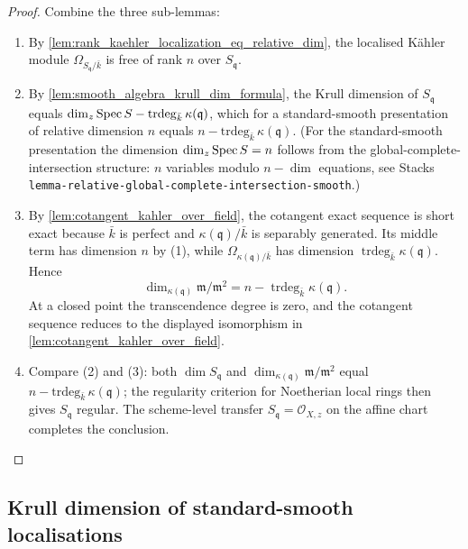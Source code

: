 \begin{proof}
  Combine the three sub-lemmas:
  \begin{enumerate}
    \item By \cref{lem:rank_kaehler_localization_eq_relative_dim},
      the localised K\"ahler module \(\Omega_{S_{\mathfrak q} / \bar k}\)
      is free of rank \(n\) over \(S_{\mathfrak q}\).
    \item By \cref{lem:smooth_algebra_krull_dim_formula}, the Krull dimension of
      \(S_{\mathfrak q}\) equals
      \(\dim_z \operatorname{Spec} S - \mathrm{trdeg}_{\bar k}\,\kappa(\mathfrak q)\),
      which for a standard-smooth presentation of relative dimension
      \(n\) equals \(n - \mathrm{trdeg}_{\bar k}\,\kappa(\mathfrak q)\).
      (For the standard-smooth presentation the dimension
      \(\dim_z \operatorname{Spec} S = n\) follows from the global-complete-intersection
      structure: \(n\) variables modulo \(n - \dim\) equations, see
      Stacks \texttt{lemma-relative-global-complete-intersection-smooth}.)
    \item By \cref{lem:cotangent_kahler_over_field}, the cotangent exact
      sequence is short exact because \(\bar k\) is perfect and
      \(\kappa(\mathfrak q)/\bar k\) is separably generated.  Its middle
      term has dimension \(n\) by (1), while
      \(\Omega_{\kappa(\mathfrak q)/\bar k}\) has dimension
      \(\operatorname{trdeg}_{\bar k}\kappa(\mathfrak q)\).  Hence
      \[
        \dim_{\kappa(\mathfrak q)}\mathfrak m/\mathfrak m^2
        =n-\operatorname{trdeg}_{\bar k}\kappa(\mathfrak q).
      \]
      At a closed point the transcendence degree is zero, and the
      cotangent sequence reduces to the displayed isomorphism in
      \cref{lem:cotangent_kahler_over_field}.
    \item Compare (2) and (3): both \(\dim S_{\mathfrak q}\) and
      \(\dim_{\kappa(\mathfrak q)} \mathfrak m / \mathfrak m^2\) equal
      \(n - \mathrm{trdeg}_{\bar k}\,\kappa(\mathfrak q)\); the
      regularity criterion for Noetherian local rings then gives \(S_{\mathfrak q}\)
      regular. The scheme-level transfer
      \(S_{\mathfrak q} = \mathcal O_{X, z}\) on the affine chart completes
      the conclusion.
  \end{enumerate}
\end{proof}

\subsection{Krull dimension of standard-smooth localisations}
\label{subsec:stage6_iib_substrate_iter200}

